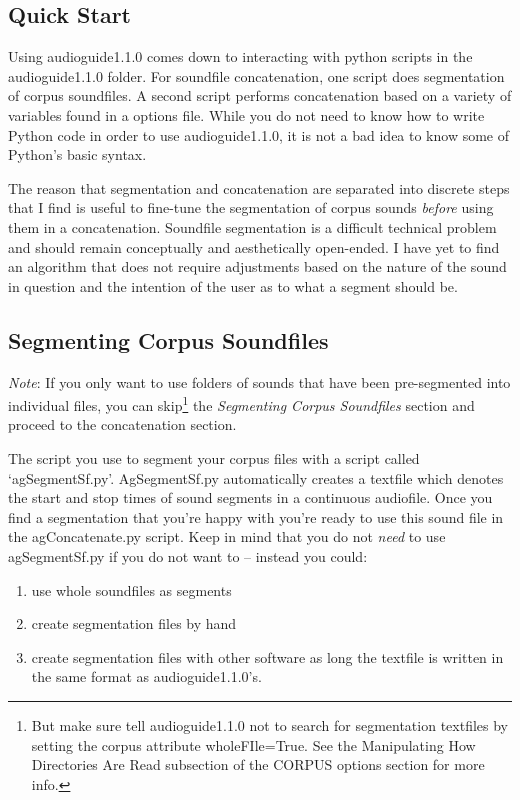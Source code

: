 \documentclass{article}
\newcommand{\ag}{audioguide1.1.0\xspace}
\begin{document}
\begin{spacing}{1.2}
  


\section{Quick Start}
Using \ag comes down to interacting with python scripts in the \ag folder.  For soundfile concatenation, one script does segmentation of corpus soundfiles.  A second script performs concatenation based on a variety of variables found in a options file.  While you do not need to know how to write Python code in order to use \ag, it is not a bad idea to know some of Python's basic syntax.

The reason that segmentation and concatenation are separated into discrete steps that I find is useful to fine-tune the segmentation of corpus sounds \emph{before} using them in a concatenation.  Soundfile segmentation is a difficult technical problem and should remain conceptually and aesthetically open-ended.  I have yet to find an algorithm that does not require adjustments based on the nature of the sound in question and the intention of the user as to what a segment should be.


\subsection{Segmenting Corpus Soundfiles}
\emph{Note}: If you only want to use folders of sounds that have been pre-segmented into individual files, you can skip\footnote{But make sure tell \ag not to search for segmentation textfiles by setting the corpus attribute wholeFIle=True.  See the Manipulating How Directories Are Read subsection of the CORPUS options section for more info.} the \emph{Segmenting Corpus Soundfiles} section and proceed to the concatenation section.

The script you use to segment your corpus files with a script called `agSegmentSf.py'.  AgSegmentSf.py automatically creates a textfile which denotes the start and stop times of sound segments in a continuous audiofile.  Once you find a segmentation that you're happy with you're ready to use this sound file in the agConcatenate.py script.
Keep in mind that you do not \emph{need} to use agSegmentSf.py if you do not want to -- instead you could:
\begin{enumerate}
\item use whole soundfiles as segments
\item create segmentation files by hand
\item create segmentation files with other software as long the textfile is written in the same format as \ag's.
\end{enumerate}


\end{spacing}
\end{document}
